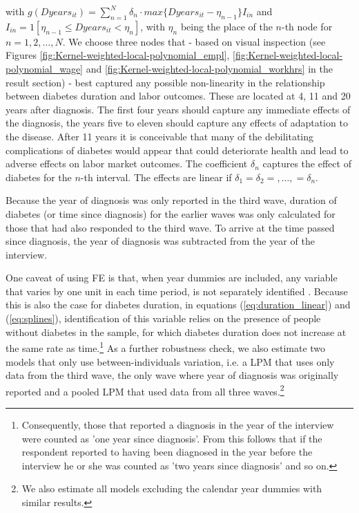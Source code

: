 \documentclass[12pt,english]{article}
\begin{document}
\noindent with $g(Dyears_{it})=\sum_{n=1}^{N}\delta_{n}\cdot max\{Dyears_{it}-\eta_{n-1}\}I_{in}$ and $I_{in}=1[\eta_{n-1}\leq Dyears_{it}<\eta_{n}]$, with $\eta_{n}$ being the place of the $n$-th node for $n=1,2,\ldots,N$. We choose three nodes that - based on visual inspection (see Figures \ref{fig:Kernel-weighted-local-polynomial_empl}, \ref{fig:Kernel-weighted-local-polynomial_wage} and \ref{fig:Kernel-weighted-local-polynomial_workhrs} in the result section) - best captured any possible non-linearity in the
relationship between diabetes duration and labor outcomes. These are located at 4, 11 and 20 years after diagnosis. The
first four years should capture any immediate effects of the diagnosis, the years five to eleven should capture any effects of adaptation to the disease. After 11 years it is conceivable that many of the debilitating complications of diabetes would appear that could deteriorate health and lead to adverse effects on labor market outcomes. The coefficient $\delta_{n}$ captures the effect of diabetes for the $n$-th interval. The effects are linear if $\delta_{1}=\delta_{2}=,\ldots,=\delta_{n}$.

Because the year of diagnosis was only reported in the third wave, duration of diabetes (or time since diagnosis) for the earlier waves was only calculated for those that had also responded to the third wave. To arrive at the time passed since diagnosis, the year of diagnosis was subtracted from the year of the interview.

One caveat of using \ac{FE} is that, when year dummies are included, any variable that varies by one unit in each time period, is not separately identified \parencite{Wooldridge2012}. Because this is also the case for diabetes duration, in equations (\ref{eq:duration_linear}) and (\ref{eq:splines}), identification of this variable relies on the presence of people without diabetes in the sample, for which diabetes duration does not increase at the same rate as time.\footnote{Consequently, those that reported a diagnosis in the year of the interview were counted as 'one year since diagnosis'. From this follows that if the respondent reported to having been diagnosed in the year before the interview he or she was counted as 'two years since diagnosis' and so on.} As a further robustness check, we also estimate two models that only use between-individuals variation, i.e. a \ac{LPM} that uses only data from the third wave, the only wave where year of diagnosis was originally reported and a pooled \ac{LPM} that used data from all three waves.\footnote{We also estimate all models excluding the calendar year dummies with similar results.}
\end{document}
